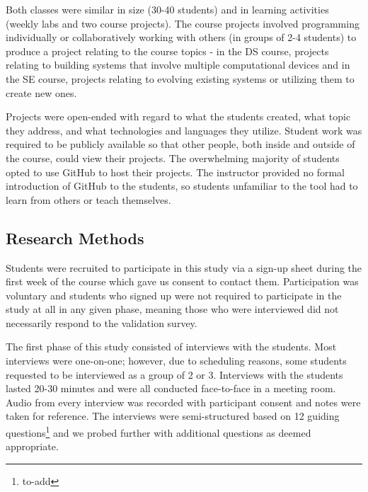 Both classes were similar in size (30-40 students) and in learning activities (weekly labs and two course projects). The course projects involved programming individually or collaboratively working with others (in groups of 2-4 students) to produce a project relating to the course topics - in the DS course, projects relating to building systems that involve multiple computational devices and in the SE course, projects relating to evolving existing systems or utilizing them to create new ones.

Projects were open-ended with regard to what the students created, what topic they address, and what technologies and languages they utilize. Student work was required to be publicly available so that other people, both inside and outside of the course, could view their projects. The overwhelming majority of students opted to use GitHub to host their projects. The instructor provided no formal introduction of GitHub to the students, so students unfamiliar to the tool had to learn from others or teach themselves. %

\subsection{Research Methods}
Students were recruited to participate in this study via a sign-up sheet during the first week of the course which gave us consent to contact them. Participation was voluntary and students who signed up were not required to participate in the study at all in any given phase, meaning those who were interviewed did not necessarily respond to the validation survey.

The first phase of this study consisted of interviews with the students. Most interviews were one-on-one; however, due to scheduling reasons, some students requested to be interviewed as a group of 2 or 3. Interviews with the students lasted 20-30 minutes and were all conducted face-to-face in a meeting room. Audio from every interview was recorded with participant consent and notes were taken for reference. The interviews were semi-structured based on 12 guiding questions\footnote{to-add} and we probed further with additional questions as deemed appropriate. %


